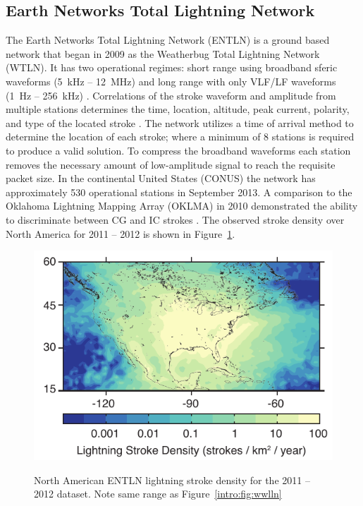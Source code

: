 \subsection{Earth Networks Total Lightning Network}

The Earth Networks Total Lightning Network (ENTLN) is a ground based network that began in 2009 as the Weatherbug Total Lightning Network (WTLN).
It has two operational regimes: short range using broadband sferic waveforms (5~kHz -- 12~MHz) and long range with only VLF/LF waveforms (1~Hz -- 256~kHz) \citep{Heckman2010}.
Correlations of the stroke waveform and amplitude from multiple stations determines the time, location, altitude, peak current, polarity, and type of the located stroke \citep{Liu2011a}.
The network utilizes a time of arrival method to determine the location of each stroke; where a minimum of 8 stations is required to produce a valid solution.
To compress the broadband waveforms each station removes the necessary amount of low-amplitude signal to reach the requisite packet size.
In the continental United States (CONUS) the network has approximately 530 operational stations in September 2013.
A comparison to the Oklahoma Lightning Mapping Array (OKLMA) in 2010 demonstrated the ability to discriminate between CG and IC strokes \citep{Beasley2010}.
The observed stroke density over North America for 2011 -- 2012 is shown in Figure~\ref{intro:fig:entln}.

\begin{figure}[ht!]
	\centering
	\includegraphics[scale=1]{Introduction/Figures/entln_density.pdf}\\
	\caption{North American ENTLN lightning stroke density for the 2011 -- 2012 dataset.
	              Note same range as Figure~\ref{intro:fig:wwlln}}
	\label{intro:fig:entln}
\end{figure}

